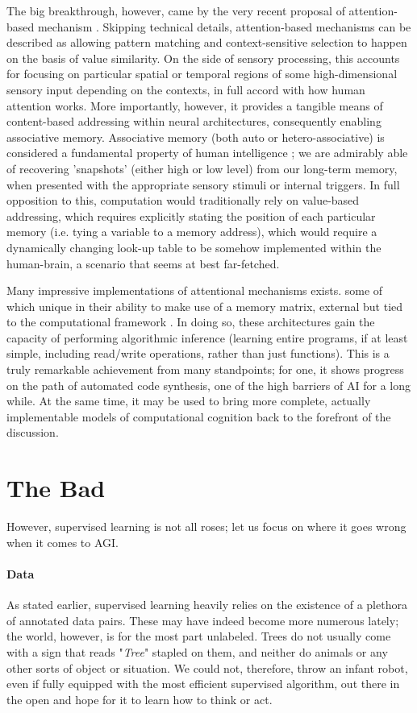 \documentclass[]{article}
\begin{document}
The big breakthrough, however, came by the very recent proposal of attention-based mechanism \cite{DBLP:journals/corr/MnihHGK14} . Skipping technical details, attention-based mechanisms can be described as allowing pattern matching and context-sensitive selection to happen on the basis of value similarity. On the side of sensory processing, this accounts for focusing on particular spatial or temporal regions of some high-dimensional sensory input depending on the contexts, in full accord with how human attention works. More importantly, however, it provides a tangible means of content-based addressing within neural architectures, consequently enabling associative memory. Associative memory (both auto or hetero-associative) is considered a fundamental property of human intelligence \cite{blah, Hopfield1982}; we are admirably able of recovering 'snapshots' (either high or low level) from our long-term memory, when presented with the appropriate sensory stimuli or internal triggers. In full opposition to this, computation would traditionally rely on value-based addressing, which requires explicitly stating the position of each particular memory (i.e. tying a variable to a memory address), which would require a dynamically changing look-up table to be somehow implemented within the human-brain, a scenario that seems at best far-fetched.

Many impressive implementations of attentional mechanisms exists. some of which unique in their ability to make use of a memory matrix, external but tied to the computational framework \cite{NIPS2015_5846, Graves2016}. In doing so, these architectures gain the capacity of performing algorithmic inference (learning entire programs, if at least simple, including read/write operations, rather than just functions). This is a truly remarkable achievement from many standpoints; for one, it shows progress on the path of automated code synthesis, one of the high barriers of AI for a long while. At the same time, it may be used to bring more complete, actually implementable models of computational cognition back to the forefront of the discussion.

\section{The Bad}
However, supervised learning is not all roses; let us focus on where it goes wrong when it comes to AGI.

\paragraph{Data}
As stated earlier, supervised learning heavily relies on the existence of a plethora of annotated data pairs. These may have indeed become more numerous lately; the world, however, is for the most part unlabeled. Trees do not usually come with a sign that reads "\textit{Tree}" stapled on them, and neither do animals or any other sorts of object or situation. We could not, therefore, throw an infant robot, even if fully equipped with the most efficient supervised algorithm, out there in the open and hope for it to learn how to think or act. 
\end{document}
